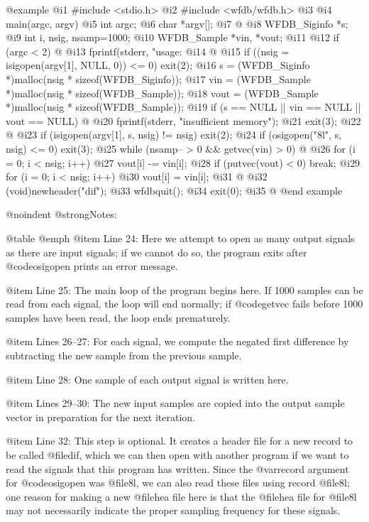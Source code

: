 {{{{{{{{{{@example
 @i{1}  #include <stdio.h>
 @i{2}  #include <wfdb/wfdb.h>
 @i{3}  
 @i{4}  main(argc, argv)
 @i{5}  int argc;
 @i{6}  char *argv[];
 @i{7}  @{
 @i{8}      WFDB_Siginfo *s;
 @i{9}      int i, nsig, nsamp=1000;
@i{10}      WFDB_Sample *vin, *vout;
@i{11}  
@i{12}      if (argc < 2) @{
@i{13}          fprintf(stderr, "usage: %
@i{14}      @}
@i{15}      if ((nsig = isigopen(argv[1], NULL, 0)) <= 0) exit(2);
@i{16}      s = (WFDB_Siginfo *)malloc(nsig * sizeof(WFDB_Siginfo));
@i{17}      vin = (WFDB_Sample *)malloc(nsig * sizeof(WFDB_Sample));
@i{18}      vout = (WFDB_Sample *)malloc(nsig * sizeof(WFDB_Sample));
@i{19}      if (s == NULL || vin == NULL || vout == NULL) @{
@i{20}          fprintf(stderr, "insufficient memory\n");
@i{21}          exit(3);
@i{22}      @}
@i{23}      if (isigopen(argv[1], s, nsig) != nsig) exit(2);
@i{24}      if (osigopen("8l", s, nsig) <= 0) exit(3);
@i{25}      while (nsamp-- > 0 && getvec(vin) > 0) @{
@i{26}          for (i = 0; i < nsig; i++)
@i{27}              vout[i] -= vin[i];
@i{28}          if (putvec(vout) < 0) break;
@i{29}          for (i = 0; i < nsig; i++)
@i{30}              vout[i] = vin[i];
@i{31}      @}
@i{32}      (void)newheader("dif");
@i{33}      wfdbquit();
@i{34}      exit(0);
@i{35}  @}
@end example

@noindent
@strong{Notes:}

@table @emph
@item Line 24:
Here we attempt to open as many output signals as there are input
signals; if we cannot do so, the program exits after @code{osigopen}
prints an error message.

@item Line 25:
The main loop of the program begins here.  If 1000 samples can be read
from each signal, the loop will end normally; if @code{getvec} fails
before 1000 samples have been read, the loop ends prematurely.

@item Lines 26--27:
For each signal, we compute the negated first difference by subtracting
the new sample from the previous sample.

@item Line 28:
One sample of each output signal is written here.

@item Lines 29--30:
The new input samples are copied into the output sample vector in preparation
for the next iteration.

@item Line 32:
This step is optional.  It creates a header file for a new record
to be called @file{dif}, which we can then open with another program if
we want to read the signals that this program has written.  Since the
@var{record} argument for @code{osigopen} was @file{8l}, we can also
read these files using record @file{8l}; one reason for making a new
@file{hea} file here is that the @file{hea} file for @file{8l} may
not necessarily indicate the proper sampling frequency for these
signals.

}}}}}}}}}}
